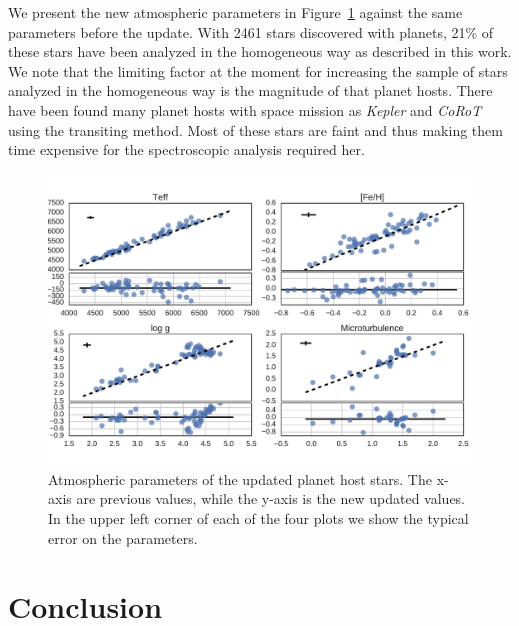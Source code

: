 \documentclass{aa}
\begin{document}
We present the new atmospheric parameters in Figure~\ref{fig:update} against the
same parameters before the update. With 2461 stars discovered with planets, 21\%
of these stars have been analyzed in the homogeneous way as described in this
work. We note that the limiting factor at the moment for increasing the sample
of stars analyzed in the homogeneous way is the magnitude of that planet hosts.
There have been found many planet hosts with space mission as \emph{Kepler} and
\emph{CoRoT} using the transiting method. Most of these stars are faint and thus
making them time expensive for the spectroscopic analysis required her.

\begin{figure}[tpb]
    \centering
    \includegraphics[width=1.0\linewidth]{figures/update.pdf}
    \caption{Atmospheric parameters of the updated planet host stars. The x-axis
    are previous values, while the y-axis is the new updated values. In the
    upper left corner of each of the four plots we show the typical error
    on the parameters.}
    \label{fig:update}
\end{figure}




\section{Conclusion}
\label{sec:conclusion}
\end{document}

